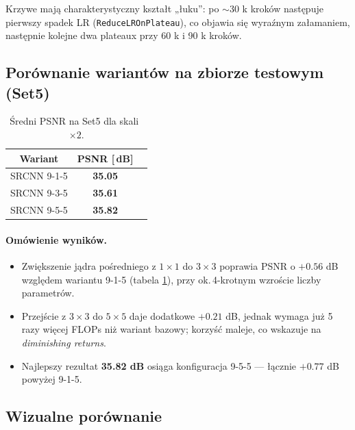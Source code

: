 \documentclass[11pt]{article}
\begin{document}
Krzywe mają charakterystyczny kształt „łuku”:
po \(\sim\)30 k kroków następuje pierwszy spadek
LR (\texttt{ReduceLROnPlateau}), co objawia się wyraźnym załamaniem,
następnie kolejne dwa plateaux przy 60 k i 90 k kroków.

\subsection{Porównanie wariantów na zbiorze testowym (Set5)}

\begin{table}[h]
\centering
\begin{tabular}{@{}ccc@{}}
\toprule
Wariant & PSNR [$\,$dB] \\ \midrule
SRCNN 9-1-5  & \textbf{35.05} \\
SRCNN 9-3-5  & \textbf{35.61} \\
SRCNN 9-5-5  & \textbf{35.82} \\ \bottomrule
\end{tabular}
\caption{Średni PSNR na Set5 dla skali~$\times2$.}
\label{tab:test_psnr}
\end{table}


\paragraph{Omówienie wyników.}
\begin{itemize}
  \item Zwiększenie jądra pośredniego z \(1\times1\) do \(3\times3\)
        poprawia PSNR o \(+0.56\) dB względem wariantu 9-1-5
        (tabela \ref{tab:test_psnr}), przy ok.\,4-krotnym wzroście
        liczby parametrów.
  \item Przejście z \(3\times3\) do \(5\times5\) daje dodatkowe
        \(+0.21\) dB, jednak wymaga już 5 razy więcej FLOPs niż
        wariant bazowy; korzyść maleje, co wskazuje na
        \emph{diminishing returns}.
  \item Najlepszy rezultat \textbf{35.82 dB} osiąga konfiguracja 9-5-5
        — łącznie \(+0.77\) dB powyżej 9-1-5.
\end{itemize}

\subsection{Wizualne porównanie}

\end{document}

